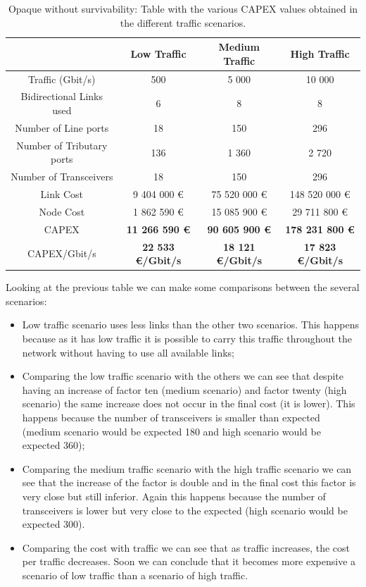 \begin{table}[h!]
\centering
\begin{tabular}{| c | c | c | c |}
 \hline
  & Low Traffic & Medium Traffic  & High Traffic \\
 \hline\hline
 Traffic (Gbit/s) & 500 & 5 000 & 10 000 \\ \hline
 Bidirectional Links used & 6 & 8 & 8 \\ \hline
 Number of Line ports & 18 & 150 & 296 \\ \hline
 Number of Tributary ports & 136 & 1 360 & 2 720 \\ \hline
 Number of Transceivers & 18 & 150 & 296 \\ \hline
 Link Cost & 9 404 000 \euro & 75 520 000 \euro & 148 520 000 \euro \\ \hline
 Node Cost & 1 862 590 \euro & 15 085 900 \euro & 29 711 800 \euro \\ \hline
 CAPEX & \textbf{11 266 590 \euro} & \textbf{90 605 900 \euro} & \textbf{178 231 800 \euro} \\ \hline
 CAPEX/Gbit/s & \textbf{22 533 \euro/Gbit/s} & \textbf{18 121 \euro/Gbit/s} & \textbf{17 823 \euro/Gbit/s}\\
 \hline
\end{tabular}
\caption{Opaque without survivability: Table with the various CAPEX values obtained in the different traffic scenarios.}
\label{table_comparative_opaque_surv}
\end{table}

Looking at the previous table we can make some comparisons between the several scenarios:

\begin{itemize}
  \item Low traffic scenario uses less links than the other two scenarios. This happens because as it has low traffic it is possible to carry this traffic throughout the network without having to use all available links;
  \item Comparing the low traffic scenario with the others we can see that despite having an increase of factor ten (medium scenario) and factor twenty (high scenario) the same increase does not occur in the final cost (it is lower). This happens because the number of transceivers is smaller than expected (medium scenario would be expected 180 and high scenario would be expected 360);
  \item Comparing the medium traffic scenario with the high traffic scenario we can see that the increase of the factor is double and in the final cost this factor is very close but still inferior. Again this happens because the number of transceivers is lower but very close to the expected (high scenario would be expected 300).
  \item Comparing the cost with traffic we can see that as traffic increases, the cost per traffic decreases. Soon we can conclude that it becomes more expensive a scenario of low traffic than a scenario of high traffic.
\end{itemize}



